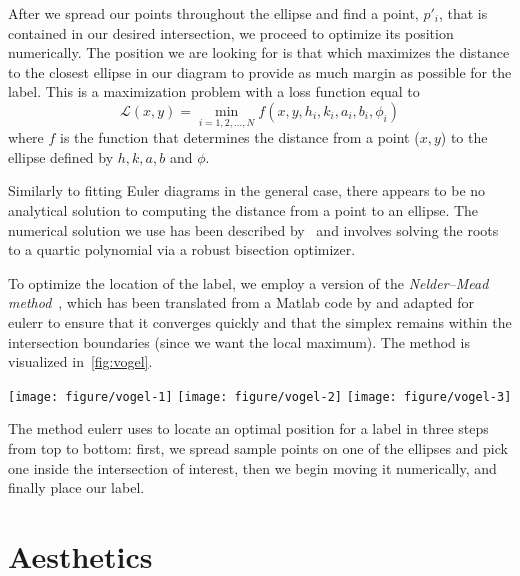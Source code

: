 \documentclass[
  oneside,
  openany,
  numbers=noendperiod,
  parskip=half,
  bibliography=totoc
]{scrbook}\usepackage[]{graphicx}\usepackage{xcolor}
\newenvironment{knitrout}{}{} %
\newcommand{\proglang}[1]{\textsf{#1}}
\newcommand{\pkg}[1]{{\fontseries{b}\selectfont #1}}
\begin{document}
After we spread our points throughout the ellipse and find a point, $p'_i$, that
is contained in our desired intersection, we proceed to optimize its position
numerically. The position we are looking for is that which maximizes the
distance to the closest ellipse in our diagram to provide as much margin as
possible for the label. This is a maximization problem with a loss function equal to
\begin{equation}
\mathcal{L}(x,y) = \min_{i=1,2,\dots,N} f(x,y,h_i,k_i,a_i,b_i,\phi_i)
\label{eq:lossDist}
\end{equation}
where $f$ is the function that determines the distance from a point ($x,y$) to
the ellipse defined by $h,k,a,b$ and $\phi$.

Similarly to fitting Euler diagrams in the general case, there appears to be no
analytical solution to computing the distance from a point to an ellipse. The
numerical solution we use has been described by~\citet{Eberly_2016a} and
involves solving the roots to a quartic polynomial via a robust
bisection optimizer.

To optimize the location of the label, we employ a version of the
\emph{Nelder--Mead method}~\citep{Nelder_1965}, which has been translated from
a \proglang{Matlab} code by \citet{Kelley_1999} and adapted for \pkg{eulerr} to
ensure that it converges quickly and that the simplex remains within the
intersection boundaries (since we want the local maximum). The method is
visualized in~\cref{fig:vogel}.
\begin{marginfigure}
\begin{knitrout}\small
{}\color{fgcolor}

{\centering \texttt{[image: figure/vogel-1]} 
\texttt{[image: figure/vogel-2]} 
\texttt{[image: figure/vogel-3]} 

}



\end{knitrout}
\caption{The method eulerr uses to locate an optimal position for a label in
three steps from top to bottom: first, we spread sample points on one of the
ellipses and pick one inside the intersection of interest, then we begin moving
it numerically, and finally place our label.}
\label{fig:vogel}
\end{marginfigure}

\section{Aesthetics}
\label{sec:aesthetics}
\end{document}
